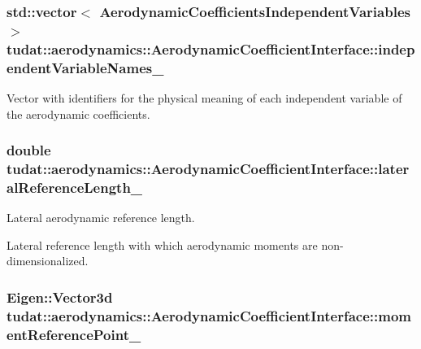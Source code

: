 \subsubsection[{\texorpdfstring{independent\+Variable\+Names\+\_\+}{independentVariableNames_}}]{\setlength{\rightskip}{0pt plus 5cm}std\+::vector$<$ Aerodynamic\+Coefficients\+Independent\+Variables $>$ tudat\+::aerodynamics\+::\+Aerodynamic\+Coefficient\+Interface\+::independent\+Variable\+Names\+\_\+\hspace{0.3cm}{\ttfamily [protected]}}\hypertarget{classtudat_1_1aerodynamics_1_1AerodynamicCoefficientInterface_a5e0570c4a1562fa17fde2fa5c5e2b3a8}{}\label{classtudat_1_1aerodynamics_1_1AerodynamicCoefficientInterface_a5e0570c4a1562fa17fde2fa5c5e2b3a8}
Vector with identifiers for the physical meaning of each independent variable of the aerodynamic coefficients. 
\subsubsection[{\texorpdfstring{lateral\+Reference\+Length\+\_\+}{lateralReferenceLength_}}]{\setlength{\rightskip}{0pt plus 5cm}double tudat\+::aerodynamics\+::\+Aerodynamic\+Coefficient\+Interface\+::lateral\+Reference\+Length\+\_\+\hspace{0.3cm}{\ttfamily [protected]}}\hypertarget{classtudat_1_1aerodynamics_1_1AerodynamicCoefficientInterface_addb200a9776750fdc60ae9d5f9291fc8}{}\label{classtudat_1_1aerodynamics_1_1AerodynamicCoefficientInterface_addb200a9776750fdc60ae9d5f9291fc8}


Lateral aerodynamic reference length. 

Lateral reference length with which aerodynamic moments are non-\/dimensionalized. 
\subsubsection[{\texorpdfstring{moment\+Reference\+Point\+\_\+}{momentReferencePoint_}}]{\setlength{\rightskip}{0pt plus 5cm}Eigen\+::\+Vector3d tudat\+::aerodynamics\+::\+Aerodynamic\+Coefficient\+Interface\+::moment\+Reference\+Point\+\_\+\hspace{0.3cm}{\ttfamily [protected]}}\hypertarget{classtudat_1_1aerodynamics_1_1AerodynamicCoefficientInterface_a88e4085f5377db07dece01f46badc536}{}\label{classtudat_1_1aerodynamics_1_1AerodynamicCoefficientInterface_a88e4085f5377db07dece01f46badc536}


